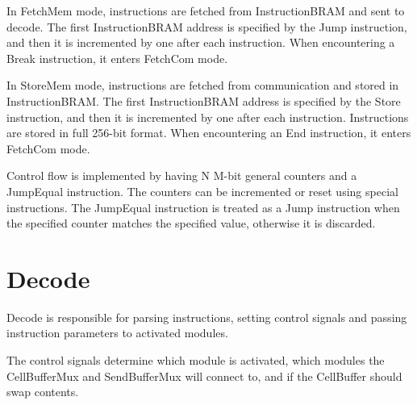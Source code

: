 In FetchMem mode, instructions are fetched from InstructionBRAM and sent to decode.
The first InstructionBRAM address is specified by the Jump instruction, and then it is incremented by one after each instruction.
When encountering a Break instruction, it enters FetchCom mode.

In StoreMem mode, instructions are fetched from communication and stored in InstructionBRAM.
The first InstructionBRAM address is specified by the Store instruction, and then it is incremented by one after each instruction.
Instructions are stored in full 256-bit format.
When encountering an End instruction, it enters FetchCom mode.

Control flow is implemented by having N M-bit general counters and a JumpEqual instruction.
The counters can be incremented or reset using special instructions.
The JumpEqual instruction is treated as a Jump instruction when the specified counter matches the specified value, otherwise it is discarded.

\section{Decode}

Decode is responsible for parsing instructions, setting control signals and passing instruction parameters to activated modules.

The control signals determine which module is activated, which modules the CellBufferMux and SendBufferMux will connect to, and if the CellBuffer should swap contents.








